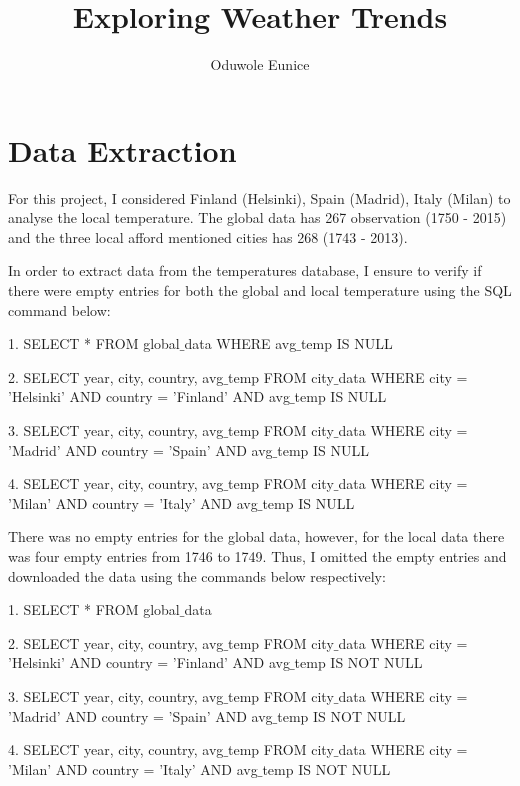 \documentclass[10pt,a4paper]{article}
\author{Oduwole Eunice}
\title{Exploring Weather Trends}
\begin{document}
\maketitle

\section*{Data Extraction}
\noindent For this project, I considered  Finland (Helsinki), Spain (Madrid), Italy (Milan) to analyse the local temperature. The global data has 267 observation (1750 - 2015) and the three local afford mentioned cities has 268 (1743 - 2013). 

\noindent In order to extract data from the temperatures database, I ensure to verify if there were empty entries for both the global and local temperature  using the SQL command below:

\begin{list}{}{}
\item[1.] SELECT * FROM global$\_$data WHERE avg$\_$temp IS NULL 
\item[2.] SELECT year, city, country, avg$\_$temp FROM city$\_$data WHERE city = 'Helsinki' AND country = 'Finland' AND avg$\_$temp IS NULL
\item[3.] SELECT year, city, country, avg$\_$temp FROM city$\_$data WHERE city = 'Madrid' AND country = 'Spain' AND avg$\_$temp IS NULL
\item[4.] SELECT year, city, country, avg$\_$temp FROM city$\_$data WHERE city = 'Milan' AND country = 'Italy' AND avg$\_$temp IS NULL
\end{list}
There was no empty entries for the global data, however, for the local data there was four empty entries from 1746 to 1749. Thus, I omitted the empty entries and downloaded the data using the commands below respectively:  

\begin{list}{}{}
 \item[1.] SELECT * FROM global$\_$data 
 \item[2.] SELECT year, city, country, avg$\_$temp FROM city$\_$data WHERE city = 'Helsinki' AND country = 'Finland' AND avg$\_$temp IS NOT NULL
 \item[3.] SELECT year, city, country, avg$\_$temp FROM city$\_$data WHERE city = 'Madrid' AND country = 'Spain' AND avg$\_$temp IS NOT NULL
 \item[4.] SELECT year, city, country, avg$\_$temp FROM city$\_$data WHERE city = 'Milan' AND country = 'Italy' AND avg$\_$temp IS NOT NULL
\end{list}
\end{document}
